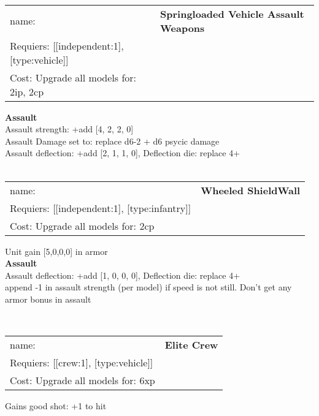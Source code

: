 \ \\
\begin{tabular}{ll}
name: & {\bf Springloaded Vehicle Assault Weapons } \\
Requiers: [[independent:1], [type:vehicle]] \\
Cost: Upgrade all models for: 2ip, 2cp \\
\end{tabular}





{\bf Assault} \ \\
Assault strength: +add [4, 2, 2, 0] 
\\ 
Assault Damage set to: replace d6-2 + d6 psycic damage
\\ 
Assault deflection: +add [2, 1, 1, 0], Deflection die: replace 4+
\\ 




\ \\
\begin{tabular}{ll}
name: & {\bf Wheeled ShieldWall } \\
Requiers: [[independent:1], [type:infantry]] \\
Cost: Upgrade all models for: 2cp \\
\end{tabular}

Unit gain [5,0,0,0] in armor\\ 




{\bf Assault} \ \\
Assault deflection: +add [1, 0, 0, 0], Deflection die: replace 4+
\\ 

append -1 in assault strength (per model) if speed is not still. Don't get any armor bonus in assault


\ \\
\begin{tabular}{ll}
name: & {\bf Elite Crew } \\
Requiers: [[crew:1], [type:vehicle]] \\
Cost: Upgrade all models for: 6xp \\
\end{tabular}

Gains good shot: +1 to hit\\ 









